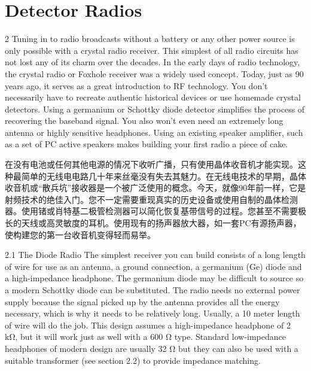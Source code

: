 \documentclass{ctexbook}
\begin{document}
\chapter{Detector Radios}
\begin{paracol}{2}
\setlength{\columnsep}{2em}
Tuning in to radio broadcasts without a battery or any other power source is only possible 
with a crystal radio receiver. This simplest of all radio circuits has not lost any of its charm 
over the decades. In the early days of radio technology, the crystal radio or Foxhole receiver was a widely used concept. Today, just as 90 years ago, it serves as a great introduction 
to RF technology. You don't necessarily have to recreate authentic historical devices or use 
homemade crystal detectors. Using a germanium or Schottky diode detector simplifies the 
process of recovering the baseband signal. You also won't even need an extremely long 
antenna or highly sensitive headphones. Using an existing speaker amplifier, such as a set 
of PC active speakers makes building your first radio a piece of cake. 

\switchcolumn

在没有电池或任何其他电源的情况下收听广播，只有使用晶体收音机才能实现。这种最简单的无线电电路几十年来丝毫没有失去其魅力。在无线电技术的早期，晶体收音机或“散兵坑”接收器是一个被广泛使用的概念。今天，就像90年前一样，它是射频技术的绝佳入门。您不一定需要重现真实的历史设备或使用自制的晶体检测器。使用锗或肖特基二极管检测器可以简化恢复基带信号的过程。您甚至不需要极长的天线或高灵敏度的耳机。使用现有的扬声器放大器，如一套PC有源扬声器，使构建您的第一台收音机变得轻而易举。

\switchcolumn*

2.1 The Diode Radio 
The simplest receiver you can build consists of a long length of wire for use as an antenna, 
a ground connection, a germanium (Ge) diode and a high-impedance headphone. The germanium diode may be difficult to source so a modern Schottky diode can be substituted. 
The radio needs no external power supply because the signal picked up by the antenna 
provides all the energy necessary, which is why it needs to be relatively long. Usually, a 10 
meter length of wire will do the job. This design assumes a high-impedance headphone of 
2 kΩ, but it will work just as well with a 600 Ω type. Standard low-impedance headphones 
of modern design are usually 32 Ω but they can also be used with a suitable transformer 
(see section 2.2) to provide impedance matching. 

\switchcolumn


\end{paracol}
\end{document}
